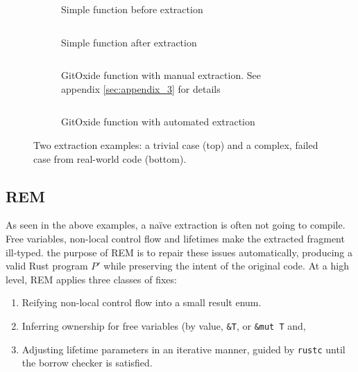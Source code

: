\begin{figure}[h]
\centering
\begin{subfigure}{0.45\linewidth}
  \inputminted[fontsize=\footnotesize, frame=none, linenos=false, breaklines=true, breakanywhere=true]{rust}{3_Chapter3/simple_original.rs}
  \caption{Simple function before extraction}
\end{subfigure}
\hfill
\begin{subfigure}{0.45\linewidth}
  \inputminted[fontsize=\footnotesize, frame=none, linenos=false, breaklines=true, breakanywhere=true]{rust}{3_Chapter3/simple_extracted.rs}
  \caption{Simple function after extraction}
\end{subfigure}

\vspace{1em}

\begin{subfigure}{0.45\linewidth}
  \inputminted[fontsize=\footnotesize, frame=none, linenos=false, breaklines=true, breakanywhere=true]{rust}{3_Chapter3/complex_original.rs}
  \caption{GitOxide function with manual extraction. See appendix \ref{sec:appendix_3} for details}
\end{subfigure}
\hfill
\begin{subfigure}{0.45\linewidth}
  \inputminted[fontsize=\footnotesize, frame=none, linenos=false, breaklines=true, breakanywhere=true]{rust}{3_Chapter3/complex_extracted.rs}
  \caption{GitOxide function with automated extraction}
  \label{content:bad_gitoxide_extraction}
\end{subfigure}

\caption{Two extraction examples: a trivial case (top) and a complex, failed case from real-world code (bottom).}
\label{fig:extraction_examples}
\end{figure}

\subsection{REM}

As seen in the above examples, a na\"ive extraction is often not going to compile. Free variables, non-local control flow and lifetimes make the extracted fragment ill-typed. the purpose of REM is to repair these issues automatically, producing a valid Rust program $P'$ while preserving the intent of the original code. At a high level, REM applies three classes of fixes:

\begin{enumerate}[label=(\roman*)]
    \item Reifying non-local control flow into a small result enum.
    \item Inferring ownership for free variables (by value, \verb|&T|, or \verb|&mut T| and,
    \item Adjusting lifetime parameters in an iterative manner, guided by \verb|rustc| until the borrow checker is satisfied.
\end{enumerate}

